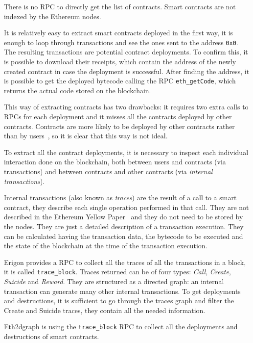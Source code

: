 There is no RPC to directly get the list of contracts. Smart contracts are not indexed by the Ethereum nodes.

It is relatively easy to extract smart contracts deployed in the first way, it is enough to loop through transactions and see the ones sent to the address \texttt{0x0}. The resulting transactions are potential contract deployments. To confirm this, it is possible to download their receipts, which contain the address of the newly created contract in case the deployment is successful. After finding the address, it is possible to get the deployed bytecode calling the RPC \texttt{eth\_getCode}, which returns the actual code stored on the blockchain.

This way of extracting contracts has two drawbacks: it requires two extra calls to RPCs for each deployment and it misses all the contracts deployed by other contracts. Contracts are more likely to be deployed by other contracts rather than by users~\cite{ethereum-sc-topology}, so it is clear that this way is not ideal.

To extract all the contract deployments, it is necessary to inspect each individual interaction done on the blockchain, both between users and contracts (via transactions) and between contracts and other contracts (via \textit{internal transactions}). 

Internal transactions (also known as \textit{traces}) are the result of a call to a smart contract, they describe each single operation performed in that call. They are not described in the Ethereum Yellow Paper~\cite{ethereum-yellow} and they do not need to be stored by the nodes. They are just a detailed description of a transaction execution. They can be calculated having the transaction data, the bytecode to be executed and the state of the blockchain at the time of the transaction execution. 

Erigon provides a RPC to collect all the traces of all the transactions in a block, it is called \texttt{trace\_block}. Traces returned can be of four types: \textit{Call}, \textit{Create}, \textit{Suicide} and \textit{Reward}. They are structured as a directed graph: an internal transaction can generate many other internal transactions. To get deployments and destructions, it is sufficient to go through the traces graph and filter the Create and Suicide traces, they contain all the needed information.

Eth2dgraph is using the \texttt{trace\_block} RPC to collect all the deployments and destructions of smart contracts.

